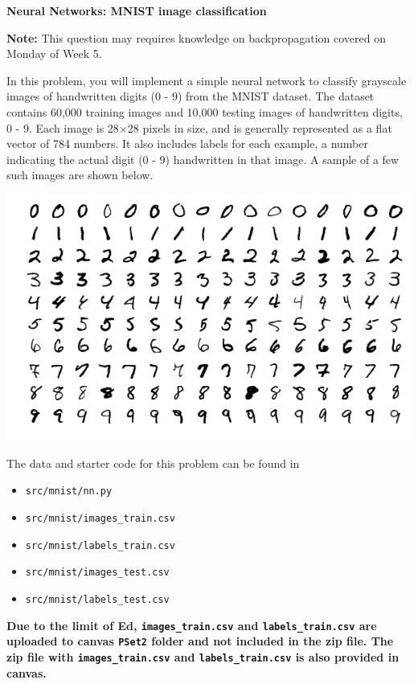 \item {} {\bf Neural Networks: MNIST image classification}

{\bf Note:} This question may requires knowledge on backpropagation covered on Monday of Week 5.

In this problem, you will implement a simple neural network
to classify grayscale images of handwritten digits (0 - 9) from
the MNIST dataset. The dataset contains 60,000 training images and
10,000 testing images of handwritten digits, 0 - 9. Each image is
28$\times$28 pixels in size, and is generally represented as a flat
vector of 784 numbers. It also includes labels for each example, a number
indicating the actual digit (0 - 9) handwritten in that image. A sample of
a few such images are shown below.

\begin{center}
\includegraphics[scale=0.5]{mnist/mnist_plot}
\end{center}


The data and starter code for this problem can be found in

\begin{itemize}
\item \texttt{src/mnist/nn.py}
\item \texttt{src/mnist/images\_train.csv}
\item \texttt{src/mnist/labels\_train.csv}
\item \texttt{src/mnist/images\_test.csv}
\item \texttt{src/mnist/labels\_test.csv}
\end{itemize}

\textbf{Due to the limit of Ed,  \texttt{images\_train.csv} and  \texttt{labels\_train.csv} are uploaded to canvas \texttt{PSet2} folder and not included in the zip file. The zip file with \texttt{images\_train.csv} and  \texttt{labels\_train.csv} is also provided in canvas.}

